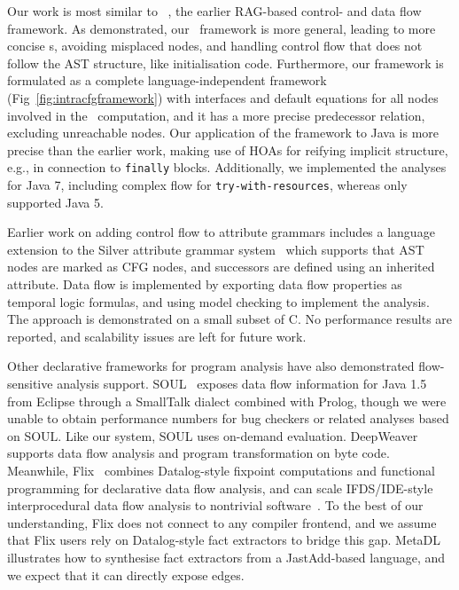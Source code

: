 
Our work is most similar to \jastaddjintraflow~\cite{10.1016/j.scico.2012.02.002}, the earlier RAG-based control- and data flow framework.
As demonstrated, our \CFG\ framework is more general, leading to more concise {\CFG}s, avoiding misplaced nodes, and handling control flow that does not follow the AST structure, like initialisation code.
Furthermore, our framework is formulated as a complete language-independent framework (Fig~\ref{fig:intracfgframework}) with interfaces and default equations for all nodes involved in the \CFG\ computation, and it has a more precise predecessor relation, excluding unreachable nodes.
Our application of the framework to Java is more precise than the earlier work, making use of HOAs for reifying implicit structure, e.g., in connection to \texttt{finally} blocks.
Additionally, we implemented the analyses for Java 7, including complex flow for \texttt{try-with-resources}, whereas \cite{10.1016/j.scico.2012.02.002} only supported Java 5.

Earlier work on adding control flow to attribute grammars includes a language extension to the Silver attribute grammar system~\cite{vanwyk2007flow,vanwyk2010silver} which supports that AST nodes are marked as CFG nodes, and successors are defined using an inherited attribute.
Data flow is implemented by exporting data flow properties as temporal logic formulas, and using model checking to implement the analysis.
The approach is demonstrated on a small subset of C.
No performance results are reported, and scalability issues are left for future work.


Other declarative frameworks for program analysis have also
demonstrated flow-sensitive analysis support.
%
SOUL~\cite{deroover2011soulsummary} exposes data flow information for
Java 1.5 from Eclipse through a SmallTalk dialect combined
with Prolog, though we were unable to obtain performance numbers for
bug checkers or related analyses based on SOUL.
Like our system, SOUL uses on-demand evaluation.
%
DeepWeaver~\cite{falconer2007deepweaver} supports data flow
analysis and program transformation on byte code.
%
Meanwhile, Flix~\cite{madsen2020fixpoints} combines Datalog-style
fixpoint computations and functional programming for declarative
data flow analysis, and can scale IFDS/IDE-style
interprocedural data flow analysis to nontrivial
software~\cite{madsen2016datalog}.  To the best of our understanding,
Flix does not connect to any compiler frontend, and
we assume that Flix users rely on Datalog-style
fact extractors to bridge this gap.
MetaDL~\cite{dura2019metadl} illustrates how to synthesise
fact extractors from a JastAdd-based language, and
we expect that it can directly expose {\intraj} edges.


